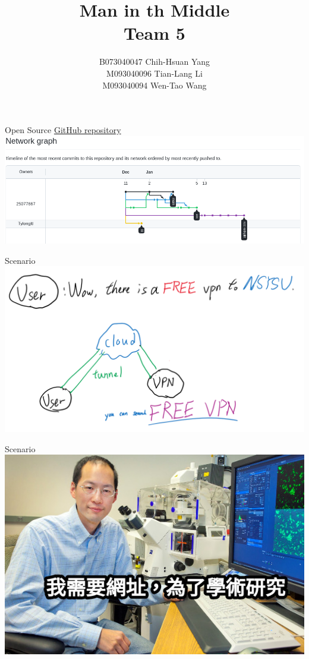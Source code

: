 \documentclass{beamer}
\title{Man in th Middle\\
{\small Team 5}}
\author{B073040047 Chih-Hsuan Yang\inst{1} \\
M093040096 Tian-Lang Li\\
M093040094 Wen-Tao Wang}
\begin{document}
\begin{frame}
    \maketitle
\end{frame}

\begin{frame}{Open Source}
    \href{https://github.com/25077667/Man-in-the-Middle-Attack/tree/scc-sslsplit}{GitHub repository}\\
    \includegraphics[width=\textwidth]{images/Screenshot_2022-01-14_00-48-10.png}
\end{frame}

\begin{frame}{Scenario}
    \includegraphics[width=\textwidth]{images/image_2022-01-14_01-42-43.png}
\end{frame}

\begin{frame}{Scenario}
    \includegraphics[width=\textwidth]{images/1613538663684.jpg}
\end{frame}
\end{document}
